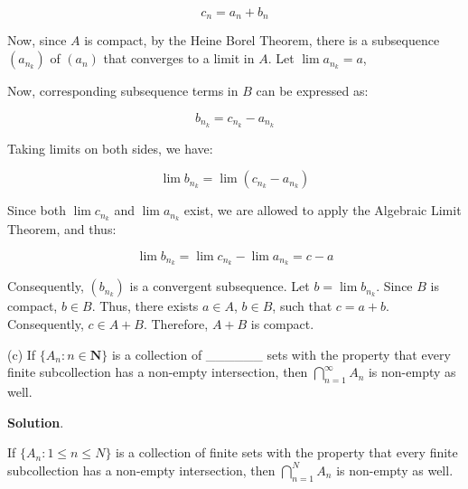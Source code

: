 \documentclass[10pt]{article}
\begin{document}
\begin{equation*}
c_{n} =a_{n} +b_{n}
\end{equation*}


Now, since $\displaystyle A$ is compact, by the Heine Borel Theorem, there is a subsequence $\displaystyle ( a_{n_{k}})$ of $\displaystyle ( a_{n})$ that converges to a limit in $\displaystyle A$. Let $\displaystyle \lim a_{n_{k}} =a$,



Now, corresponding subsequence terms in $\displaystyle B$ can be expressed as:




\begin{equation*}
b_{n_{k}} =c_{n_{k}} -a_{n_{k}}
\end{equation*}


Taking limits on both sides, we have:


\begin{equation*}
\lim b_{n_{k}} =\lim ( c_{n_{k}} -a_{n_{k}})
\end{equation*}


Since both $\displaystyle \lim c_{n_{k}}$ and $\displaystyle \lim a_{n_{k}}$ exist, we are allowed to apply the Algebraic Limit Theorem, and thus:


\begin{equation*}
\lim b_{n_{k}} =\lim c_{n_{k}} -\lim a_{n_{k}} =c-a
\end{equation*}


Consequently, $\displaystyle ( b_{n_{k}})$ is a convergent subsequence. Let $\displaystyle b=\lim b_{n_{k}}$. Since $\displaystyle B$ is compact, $\displaystyle b\in B$. Thus, there exists $\displaystyle a\in A$, $\displaystyle b\in B$, such that $\displaystyle c=a+b$. Consequently, $\displaystyle c\in A+B$. Therefore, $\displaystyle A+B$ is compact.



(c) If $\displaystyle \{A_{n} :n\in \mathbf{N}\}$ is a collection of \_\_\_\_\_\_ sets with the property that every finite subcollection has a non-empty intersection, then $\displaystyle \bigcap _{n=1}^{\infty } A_{n}$ is non-empty as well.



\textbf{Solution}. 



If $\displaystyle \{A_{n} :1\leq n\leq N\}$ is a collection of finite sets with the property that every finite subcollection has a non-empty intersection, then $\displaystyle \bigcap _{n=1}^{N} A_{n}$ is non-empty as well.
\end{document}
